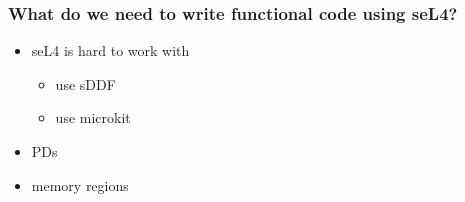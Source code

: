 \documentclass{beamer}
\begin{document}



\begin{frame}
    \frametitle{What do we need to write functional code using seL4?}
    \begin{itemize}
        \item seL4 is hard to work with
            \begin{itemize}
                \item use sDDF
                \item use microkit
            \end{itemize}
        \item PDs
        \item memory regions
    \end{itemize}
\end{frame}
\end{document}
